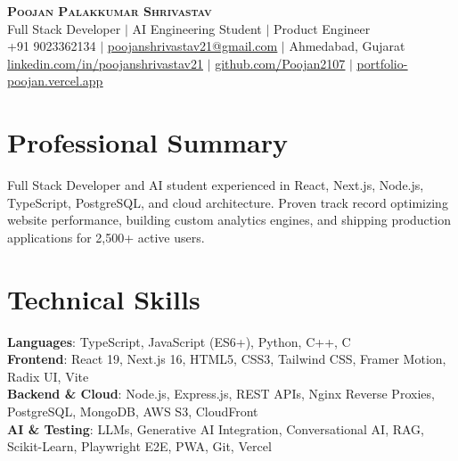 \documentclass[letterpaper,10pt]{article}
\begin{document}
\begin{center}
    \textbf{\Huge \scshape Poojan Palakkumar Shrivastav} \\ \vspace{2pt}
    \small Full Stack Developer $|$ AI Engineering Student $|$ Product Engineer \\ \vspace{2pt}
    \small +91 9023362134 $|$ \href{mailto:poojanshrivastav21@gmail.com}{\underline{poojanshrivastav21@gmail.com}} $|$ Ahmedabad, Gujarat \\ \vspace{2pt}
    \small \href{https://www.linkedin.com/in/poojanshrivastav21/}{\underline{linkedin.com/in/poojanshrivastav21}} $|$ 
    \href{https://github.com/Poojan2107}{\underline{github.com/Poojan2107}} $|$ 
    \href{https://portfolio-poojan.vercel.app/}{\underline{portfolio-poojan.vercel.app}}
\end{center}
\vspace{-8pt}

\section{Professional Summary}
\small{Full Stack Developer and AI student experienced in React, Next.js, Node.js, TypeScript, PostgreSQL, and cloud architecture. Proven track record optimizing website performance, building custom analytics engines, and shipping production applications for 2,500+ active users.}
\vspace{-4pt}

\section{Technical Skills}
 \begin{itemize}[leftmargin=0.15in, label={}, itemsep=-3pt, parsep=0pt]
    \small{\item{
     \textbf{Languages}{: TypeScript, JavaScript (ES6+), Python, C++, C} \\
     \textbf{Frontend}{: React 19, Next.js 16, HTML5, CSS3, Tailwind CSS, Framer Motion, Radix UI, Vite} \\
     \textbf{Backend \& Cloud}{: Node.js, Express.js, REST APIs, Nginx Reverse Proxies, PostgreSQL, MongoDB, AWS S3, CloudFront} \\
     \textbf{AI \& Testing}{: LLMs, Generative AI Integration, Conversational AI, RAG, Scikit-Learn, Playwright E2E, PWA, Git, Vercel}
    }}
 \end{itemize}
\vspace{-4pt}
\end{document}

